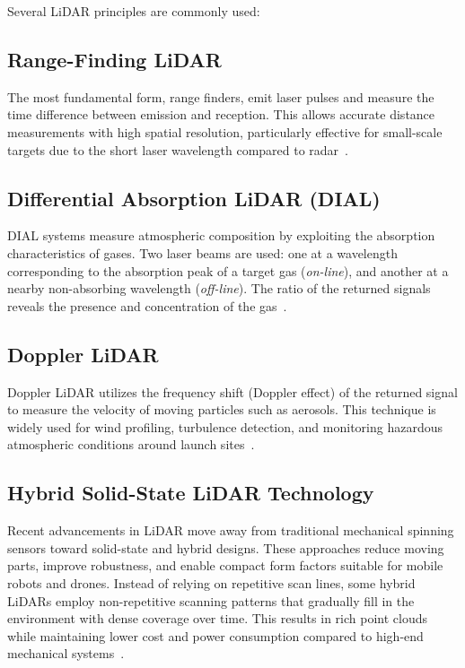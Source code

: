 \documentclass[english, bachelor, utf8]{base/thesis_telematics}
\begin{document}
Several LiDAR principles are commonly used:
\subsection*{Range-Finding LiDAR}
The most fundamental form, range finders, emit laser pulses and measure the time difference between emission and reception. 
This allows accurate distance measurements with high spatial resolution, particularly effective for small-scale targets due to the short laser wavelength compared to radar~\cite{bleier_advanced_sensory_systems}.  

\subsection*{Differential Absorption LiDAR (DIAL)}
DIAL systems measure atmospheric composition by exploiting the absorption characteristics of gases. 
Two laser beams are used: one at a wavelength corresponding to the absorption peak of a target gas (\textit{on-line}), and another at a nearby non-absorbing wavelength (\textit{off-line}). 
The ratio of the returned signals reveals the presence and concentration of the gas~\cite{bleier_advanced_sensory_systems}.  

\subsection*{Doppler LiDAR}
Doppler LiDAR utilizes the frequency shift (Doppler effect) of the returned signal to measure the velocity of moving particles such as aerosols. 
This technique is widely used for wind profiling, turbulence detection, and monitoring hazardous atmospheric conditions around launch sites~\cite{bleier_advanced_sensory_systems}.  

\subsection{Hybrid Solid-State LiDAR Technology}
Recent advancements in LiDAR move away from traditional mechanical spinning sensors toward solid-state and hybrid designs. 
These approaches reduce moving parts, improve robustness, and enable compact form factors suitable for mobile robots and drones. 
Instead of relying on repetitive scan lines, some hybrid LiDARs employ non-repetitive scanning patterns that gradually fill in the environment with dense coverage over time. 
This results in rich point clouds while maintaining lower cost and power consumption compared to high-end mechanical systems~\cite{globalgps_lidar_types,govcomm_compared}.  
\end{document}
